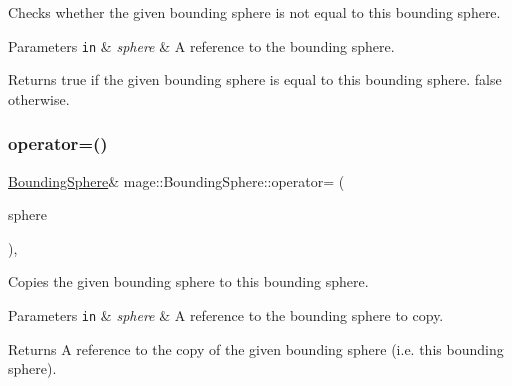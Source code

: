 Checks whether the given bounding sphere is not equal to this bounding sphere.


\begin{DoxyParams}[1]{Parameters}
\mbox{\tt in}  & {\em sphere} & A reference to the bounding sphere. \\
\hline
\end{DoxyParams}
\begin{DoxyReturn}{Returns}
{\ttfamily true} if the given bounding sphere is equal to this bounding sphere. {\ttfamily false} otherwise. 
\end{DoxyReturn}
\hypertarget{classmage_1_1_bounding_sphere_ad8159156e4258d23afdb43e4a9104743}{}\label{classmage_1_1_bounding_sphere_ad8159156e4258d23afdb43e4a9104743} 
\subsubsection{\texorpdfstring{operator=()}{operator=()}\hspace{0.1cm}{\footnotesize\ttfamily [1/2]}}
{\footnotesize\ttfamily \hyperlink{classmage_1_1_bounding_sphere}{Bounding\+Sphere}\& mage\+::\+Bounding\+Sphere\+::operator= (\begin{DoxyParamCaption}\item[{const \hyperlink{classmage_1_1_bounding_sphere}{Bounding\+Sphere} \&}]{sphere }\end{DoxyParamCaption})\hspace{0.3cm}{\ttfamily [default]}, {\ttfamily [noexcept]}}

Copies the given bounding sphere to this bounding sphere.


\begin{DoxyParams}[1]{Parameters}
\mbox{\tt in}  & {\em sphere} & A reference to the bounding sphere to copy. \\
\hline
\end{DoxyParams}
\begin{DoxyReturn}{Returns}
A reference to the copy of the given bounding sphere (i.\+e. this bounding sphere). 
\end{DoxyReturn}
\hypertarget{classmage_1_1_bounding_sphere_a2a0e22660b37c54bb0e2e76efc198281}{}\label{classmage_1_1_bounding_sphere_a2a0e22660b37c54bb0e2e76efc198281} 
